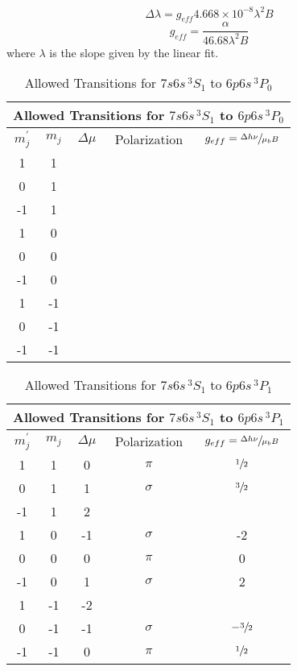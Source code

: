 \documentclass{article}
\title{}
\author{}
\date{}
\begin{document}
\begin{equation} { \Delta\lambda = g_{eff} 4.668\times10^{-8}\lambda^2B } \end{equation}
\begin{equation} {g_{eff} = \frac{\alpha}{46.68\lambda^2B}} \end{equation}
where $\lambda$ is the slope given by the linear fit. 

\begin{table}[H]
\begin{center}
\begin{tabular}{|c|c|c|c|c|}
\hline
\multicolumn{5}{|c|}{Allowed Transitions for $7s6s\,^3S_1$ to $6p6s\,^3P_0$} \\
\hline 
$m_j^{\prime}$ & $m_j$ & $\Delta\mu$ & Polarization & $g_{eff} = \sfrac{\Delta h \nu}{\mu_bB}$ \\
\hline
1& 1&&&\\ 
0 & 1&&&\\ 
-1 & 1&&&\\
1& 0&&&\\ 
0& 0&&&\\ 
-1& 0&&&\\
1&-1&&&\\
0&-1&&&\\
-1&-1&&&\\
\hline
\end{tabular}
\caption{Allowed Transitions for $7s6s\,^3S_1$ to $6p6s\,^3P_0$}
\end{center}
\end{table}

\begin{table}[H]
\begin{center}
\begin{tabular}{|c|c|c|c|c|}
\hline
\multicolumn{5}{|c|}{Allowed Transitions for $7s6s\,^3S_1$ to $6p6s\,^3P_1$} \\
\hline 
$m_j^{\prime}$ & $m_j$ & $\Delta\mu$ & Polarization & $g_{eff} = \sfrac{\Delta h \nu}{\mu_bB}$ \\
\hline
1& 1&0&$\pi$&$\sfrac{1}{2}$\\  
0 & 1&1&$\sigma$&$\sfrac32$\\ 
-1 & 1&2&&\\
1& 0&-1&$\sigma$&-2\\ 
0& 0&0&$\pi$&0\\ 
-1& 0&1&$\sigma$&2\\
1&-1&-2&&\\
0&-1&-1&$\sigma$&$-\sfrac32$\\
-1&-1&0&$\pi$&$\sfrac12$\\
\hline
\end{tabular}
\caption{Allowed Transitions for $7s6s\,^3S_1$ to $6p6s\,^3P_1$}
\end{center}
\end{table}
\end{document}

